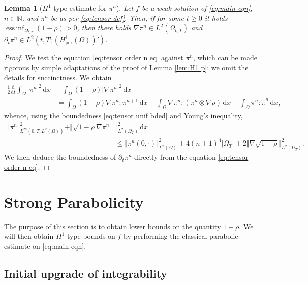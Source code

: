 \documentclass[11pt,a4paper,reqno]{amsart}
\newtheorem{lemma}[prop]{Lemma}
\theoremstyle{remark}
\theoremstyle{definition}
\numberwithin{equation}{section}
\newcommand{\per}{\mathrm{per}}
\DeclareMathOperator{\essinf}{ess \, inf}
\renewcommand{\d}{\, \mathrm{d} }
\newcommand{\der}{\mathrm{d}}
\begin{document}
\begin{lemma}[$H^1$-type estimate for $\pi^n$]\label{lem:H1 for tensors}
Let $f$ be a weak solution of \eqref{eq:main eqn}, $n\in\mathbb{N}$, and $\pi^n$ be as per \eqref{eq:tensor def}. Then, if for some $t\geq 0$ it holds $\essinf_{\Omega_{t,T}}(1-\rho)>0$, then there holds $\nabla \pi^n \in L^2(\Omega_{t,T})$ and $\partial_t \pi^n \in L^2(t,T;(H^1_\per(\Omega))')$.
\end{lemma}
\begin{proof}
We test the equation \eqref{eq:tensor order n eq} against $\pi^n$, which can be made rigorous by simple adaptations of the proof of Lemma \ref{lem:H1 p}; we omit the details for succinctness. We obtain 
\begin{equation*}
   \begin{aligned} \frac{1}{2}\frac{\der}{\der t}\int_\Omega |\pi^n|^2 \d x &+ \int_\Omega (1-\rho)|\nabla \pi^n|^2 \d x \\ 
   &= \int_\Omega (1-\rho) \nabla \pi^n : \pi^{n+1} \d x -\int_\Omega \nabla \pi^n : (\pi^n \otimes \nabla \rho) \d x + \int_\Omega \pi^n : \tilde{\pi}^n \d x, 
   \end{aligned}
\end{equation*}
whence, using the boundedness \eqref{eq:tensor unif bded} and Young's inequality, 
\begin{equation*}
   \begin{aligned} \Vert\pi^n\Vert_{L^\infty(0,T;L^2(\Omega))}^2 + \Vert \sqrt{1-\rho}\nabla \pi^n &\Vert_{L^2(\Omega_T)}^2 \d x 
  \\ &\leq \Vert \pi^n(0,\cdot) \Vert^2_{L^2(\Omega)} + 4(n+1)^4|\Omega_T| + 2\Vert \nabla \sqrt{1-\rho}\Vert^2_{L^2(\Omega_T)}.
   \end{aligned}
\end{equation*}
We then deduce the boundedness of $\partial_t \pi^n$ directly from the equation \eqref{eq:tensor order n eq}. 
\end{proof}

\section{Strong Parabolicity}\label{sec:strong parab}


The purpose of this section is to obtain lower bounds on the quantity $1\!-\!\rho$. We will then obtain $H^1$-type bounds on $f$ by performing the classical parabolic estimate on \eqref{eq:main eqn}. 



\subsection{Initial upgrade of integrability}
\end{document}
